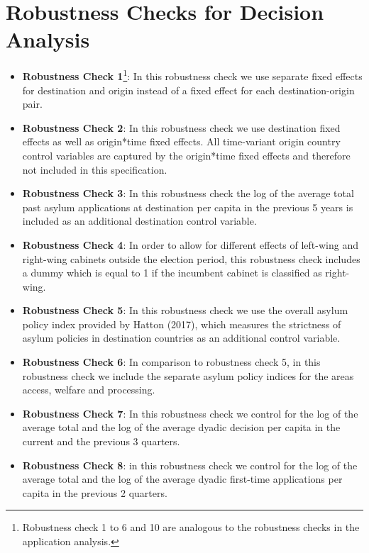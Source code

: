 \documentclass[11pt,a4paper]{scrartcl}
\begin{document}
\clearpage
\FloatBarrier
\section{Robustness Checks for Decision Analysis}


\begin{itemize}
	\itemsep0em
	\item \textbf{Robustness Check 1}\footnote{Robustness check 1 to 6 and 10 are analogous to the robustness checks in the application analysis.}: In this robustness check we use separate fixed effects for destination and origin instead of a fixed effect for each destination-origin pair.
	
	\item \textbf{Robustness Check 2}: In this robustness check we use destination fixed effects as well as origin*time fixed effects. All time-variant origin country control variables are captured by the origin*time fixed effects and therefore not included in this specification. 
	
	\item \textbf{Robustness Check 3}: In this robustness check the log of the average total past asylum applications at destination per capita in the previous 5 years is included as an additional destination control variable. 
	
	\item \textbf{Robustness Check 4}: In order to allow for different effects of left-wing and right-wing cabinets outside the election period, this robustness check includes a dummy which is equal to 1 if the incumbent cabinet is classified as right-wing.   
	
	\item \textbf{Robustness Check 5}: In this robustness check we use the overall asylum policy index provided by Hatton (2017), which measures the strictness of asylum policies in destination countries as an additional control variable.
	
	\item \textbf{Robustness Check 6}: In comparison to robustness check 5, in this robustness check we include the separate asylum policy indices for the areas access, welfare and processing. 
	
	\item \textbf{Robustness Check 7}: In this robustness check we control for the log of the average total and the log of the average dyadic decision per capita in the current and the previous 3 quarters.
	
	\item \textbf{Robustness Check 8}: in this robustness check we control for the log of the average total and the log of the average dyadic first-time applications per capita in the previous 2 quarters.
	

\end{itemize}
\end{document}
